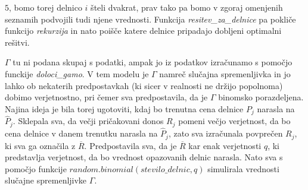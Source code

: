 \documentclass[a4paper,12pt]{article}
\theoremstyle{definition}
\begin{document}
$5$, bomo torej delnico $i$ šteli dvakrat, prav tako pa bomo v zgoraj omenjenih seznamih
podvojili tudi njene vrednosti. Funkcija \textit{resitev\_za\_delnice} pa pokliče funkcijo \textit{rekurzija}
in nato poišče katere delnice pripadajo dobljeni optimalni rešitvi.
\par
$\Gamma$ tu ni podana skupaj s podatki, ampak jo iz podatkov izračunamo s pomočjo funckije \textit{doloci\_gamo}.
V tem modelu je $\Gamma$ namreč slučajna spremenljivka in jo lahko ob nekaterih predpostavkah (ki 
sicer v realnosti ne držijo popolnoma) dobimo verjetnostno, pri čemer sva predpostavila, da je $\Gamma$
binomsko porazdeljena. Najina ideja je bila torej ugotoviti, kdaj bo trenutna cena delnice $P_j$ narasla na 
$\hat{P}_j$. Sklepala sva, da večji pričakovani donos $R_j$ pomeni večjo verjetnost, da
bo cena delnice v danem trenutku narasla na $\hat{P}_j$, zato sva izračunala povprečen $R_j$, ki
sva ga označila z $\overline{R}$. 
Predpostavila sva, da je $\overline{R}$ kar enak verjetnosti $q$, ki predstavlja verjetnost,
da bo vrednost opazovanih delnic narasla. Nato sva s pomočjo funkcije $random.binomial(stevilo\_delnic, q)$ 
simulirala vrednosti slučajne spremenljivke $\Gamma$.
\end{document}

